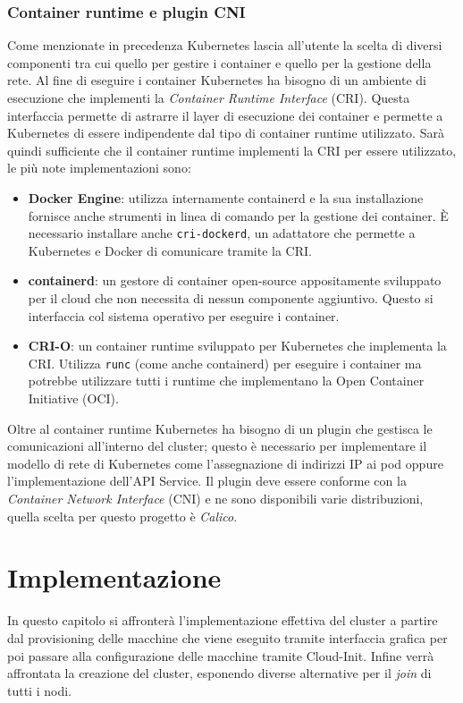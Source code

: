\documentclass[12pt,a4paper,openright,twoside]{book}
\begin{document}
\subsection{Container runtime e plugin CNI}
Come menzionate in precedenza Kubernetes lascia all'utente la scelta di diversi componenti tra cui quello per gestire i container e quello per la gestione della rete\cite{kubernetes}.
Al fine di eseguire i container Kubernetes ha bisogno di un ambiente di esecuzione che implementi la \textit{Container Runtime Interface} (CRI).
Questa interfaccia permette di astrarre il layer di esecuzione dei container e permette a Kubernetes di essere indipendente dal tipo di container runtime utilizzato. 
Sarà quindi sufficiente che il container runtime implementi la CRI per essere utilizzato, le più note implementazioni sono:
\begin{itemize}
    \item \textbf{Docker Engine}: utilizza internamente containerd e la sua installazione fornisce anche strumenti in linea di comando per la gestione dei container. 
        È necessario installare anche \texttt{cri-dockerd}, un adattatore che permette a Kubernetes e Docker di comunicare tramite la CRI.
    \item \textbf{containerd}: un gestore di container open-source appositamente sviluppato per il cloud che non necessita di nessun componente aggiuntivo. 
        Questo si interfaccia col sistema operativo per eseguire i container.
    \item \textbf{CRI-O}: un container runtime sviluppato per Kubernetes che implementa la CRI. Utilizza \texttt{runc} (come anche containerd) per eseguire i container ma potrebbe utilizzare
        tutti i runtime che implementano la Open Container Initiative (OCI).
\end{itemize}
Oltre al container runtime Kubernetes ha bisogno di un plugin che gestisca le comunicazioni all'interno del cluster; questo è
necessario per implementare il modello di rete di Kubernetes come l'assegnazione di indirizzi IP ai pod oppure l'implementazione dell'API Service.
Il plugin deve essere conforme con la \textit{Container Network Interface} (CNI) e ne sono disponibili varie distribuzioni, quella scelta per questo progetto è
\textit{Calico}.
%
\chapter{Implementazione}
In questo capitolo si affronterà l'implementazione effettiva del cluster a partire dal provisioning delle macchine che viene eseguito tramite interfaccia grafica
per poi passare alla configurazione delle macchine tramite Cloud-Init. Infine verrà affrontata la creazione del cluster, esponendo diverse alternative per il \textit{join}
di tutti i nodi.
\end{document}
